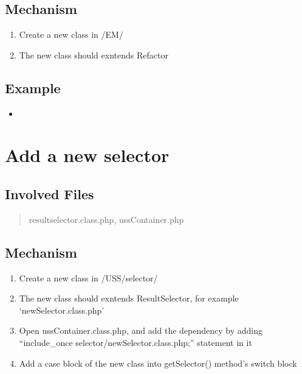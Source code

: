 \documentclass[letterpaper,10pt,english]{sphinxmanual}
\begin{document}
\subsection{Mechanism}
\label{docs/hooks/new_refactor:mechanism}\begin{enumerate}
\item {} 
Create a new class in /EM/

\item {} 
The new class should exntends Refactor

\end{enumerate}


\subsection{Example}
\label{docs/hooks/new_refactor:example}\begin{itemize}
\item {} 
{\hyperref[docs/api:ReplaceUri]{}}

\end{itemize}


\section{Add a new selector}
\label{docs/hooks/new_selector:hook-selector}\label{docs/hooks/new_selector::doc}\label{docs/hooks/new_selector:add-a-new-selector}

\subsection{Involved Files}
\label{docs/hooks/new_selector:involved-files}\begin{quote}

resultselector.class.php, ussContainer.php
\end{quote}


\subsection{Mechanism}
\label{docs/hooks/new_selector:mechanism}\begin{enumerate}
\item {} 
Create a new class in /USS/selector/

\item {} 
The new class should exntends ResultSelector, for example `newSelector.class.php'

\item {} 
Open ussContainer.class.php, and add the dependency by adding ``include\_once selector/newSelector.class.php;'' statement in it

\item {} 
Add a case block of the new class into getSelector() method's switch block

\end{enumerate}
\end{document}

